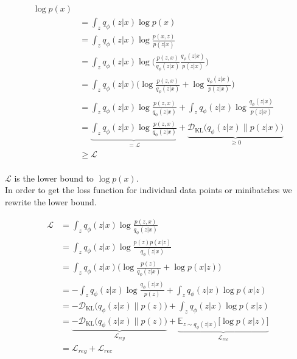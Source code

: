 \begin{align*}
  \log p(x)\\
  &= \int_z q_\phi(z|x) \log p(x)\\
  &= \int_z q_\phi(z|x) \log \frac{p(x,z)}{p(z|x)} \tag{Bayes' rule}\\
  &= \int_z q_\phi(z|x) \log\bigg(\frac{p(z,x)}{q_\phi(z|x)} \frac{q_\phi(z|x)}{p(z|x)}\bigg) \tag{Chain rule}\\
  &= \int_z q_\phi(z|x) \bigg(\log\frac{p(z,x)}{q_\phi(z|x)} + \log\frac{q_\phi(z|x)}{p(z|x)}\bigg)\\
  &= \int_z q_\phi(z|x) \log \frac{p(z,x)}{q_\phi(z|x)} + \int_z q_\phi(z|x) \log\frac{q_\phi(z|x)}{p(z|x)}\\
  &= \underbrace{\int_z q_\phi(z|x) \log \frac{p(z,x)}{q_\phi(z|x)}}_{= \mathcal{L}}+ \underbrace{\mathcal{D}_{\mathrm{KL}}\big(q_\phi(z|x) \| p(z|x)\big)}_{\geq 0}\\
  &\geq \mathcal{L}\\
\end{align*}

$\mathcal{L}$ is the lower bound to $\log p(x)$.\\
In order to get the loss function for individual data points or minibatches we rewrite the lower bound.

\begin{align*}
  \mathcal{L}
  &= \int_z q_\phi(z|x) \log\frac{p(z,x)}{q_\phi(z|x)}\\
  &= \int_z q_\phi(z|x) \log\frac{p(z) p(x|z)}{q_\phi(z|x)} \tag{we assume that x is conditionally dependent on z}\\
  &= \int_z q_\phi(z|x) \bigg(\log\frac{p(z)}{q_\phi(z|x)} + \log p(x|z)\bigg)\\
  &= -\int_z q_\phi(z|x) \log\frac{q_\phi(z|x)}{p(z)} + \int_z q_\phi(z|x) \log p(x|z)\\
  &= -\mathcal{D}_{\mathrm{KL}}\big(q_\phi(z|x) \| p(z)\big) + \int_z q_\phi(z|x) \log p(x|z)\\
  &= \underbrace{-\mathcal{D}_{\mathrm{KL}}\big(q_\phi(z|x) \| p(z)\big)}_{\mathcal{L}_{reg}} + \underbrace{\mathbb{E}_{z \sim q_\phi(z|x)}\big[ \log p(x|z)\big]}_{\mathcal{L}_{rec}}\\
  &= \mathcal{L}_{reg} + \mathcal{L}_{rec}
\end{align*}

